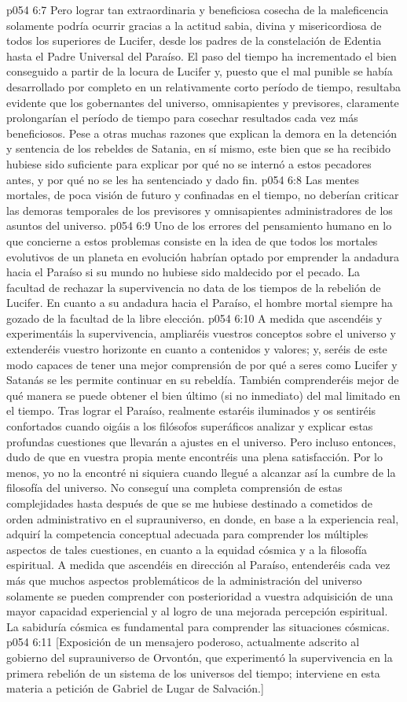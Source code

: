 \vs p054 6:7 Pero lograr tan extraordinaria y beneficiosa cosecha de la maleficencia solamente podría ocurrir gracias a la actitud sabia, divina y misericordiosa de todos los superiores de Lucifer, desde los padres de la constelación de Edentia hasta el Padre Universal del Paraíso. El paso del tiempo ha incrementado el bien conseguido a partir de la locura de Lucifer y, puesto que el mal punible se había desarrollado por completo en un relativamente corto período de tiempo, resultaba evidente que los gobernantes del universo, omnisapientes y previsores, claramente prolongarían el período de tiempo para cosechar resultados cada vez más beneficiosos. Pese a otras muchas razones que explican la demora en la detención y sentencia de los rebeldes de Satania, en sí mismo, este bien que se ha recibido hubiese sido suficiente para explicar por qué no se internó a estos pecadores antes, y por qué no se les ha sentenciado y dado fin.
\vs p054 6:8 Las mentes mortales, de poca visión de futuro y confinadas en el tiempo, no deberían criticar las demoras temporales de los previsores y omnisapientes administradores de los asuntos del universo.
\vs p054 6:9 Uno de los errores del pensamiento humano en lo que concierne a estos problemas consiste en la idea de que todos los mortales evolutivos de un planeta en evolución habrían optado por emprender la andadura hacia el Paraíso si su mundo no hubiese sido maldecido por el pecado. La facultad de rechazar la supervivencia no data de los tiempos de la rebelión de Lucifer. En cuanto a su andadura hacia el Paraíso, el hombre mortal siempre ha gozado de la facultad de la libre elección.
\vs p054 6:10 \pc A medida que ascendéis y experimentáis la supervivencia, ampliaréis vuestros conceptos sobre el universo y extenderéis vuestro horizonte en cuanto a contenidos y valores; y, seréis de este modo capaces de tener una mejor comprensión de por qué a seres como Lucifer y Satanás se les permite continuar en su rebeldía. También comprenderéis mejor de qué manera se puede obtener el bien último (si no inmediato) del mal limitado en el tiempo. Tras lograr el Paraíso, realmente estaréis iluminados y os sentiréis confortados cuando oigáis a los filósofos superáficos analizar y explicar estas profundas cuestiones que llevarán a ajustes en el universo. Pero incluso entonces, dudo de que en vuestra propia mente encontréis una plena satisfacción. Por lo menos, yo no la encontré ni siquiera cuando llegué a alcanzar así la cumbre de la filosofía del universo. No conseguí una completa comprensión de estas complejidades hasta después de que se me hubiese destinado a cometidos de orden administrativo en el suprauniverso, en donde, en base a la experiencia real, adquirí la competencia conceptual adecuada para comprender los múltiples aspectos de tales cuestiones, en cuanto a la equidad cósmica y a la filosofía espiritual. A medida que ascendéis en dirección al Paraíso, entenderéis cada vez más que muchos aspectos problemáticos de la administración del universo solamente se pueden comprender con posterioridad a vuestra adquisición de una mayor capacidad experiencial y al logro de una mejorada percepción espiritual. La sabiduría cósmica es fundamental para comprender las situaciones cósmicas.
\vsetoff
\vs p054 6:11 [Exposición de un mensajero poderoso, actualmente adscrito al gobierno del suprauniverso de Orvontón, que experimentó la supervivencia en la primera rebelión de un sistema de los universos del tiempo; interviene en esta materia a petición de Gabriel de Lugar de Salvación.]
